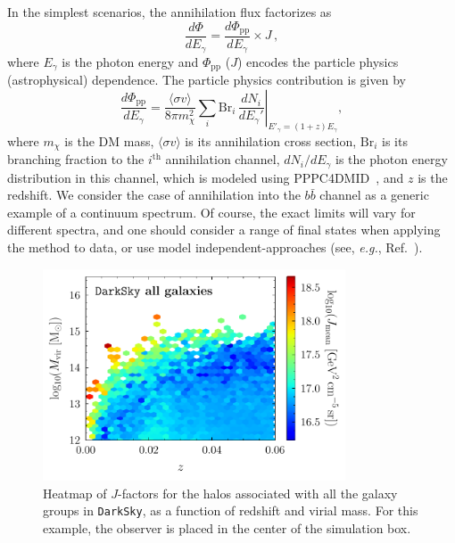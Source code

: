 In the simplest scenarios, the annihilation flux factorizes as 
\begin{equation}
\frac{d\Phi}{dE_{\gamma}} = \frac{d\Phi_\text{pp}}{dE_{\gamma}}\times J \, ,
\label{eq:flux}
\end{equation}
where $E_\gamma$ is the photon energy and $\Phi_\text{pp}$  ($J$) encodes the particle physics (astrophysical) dependence.
The particle physics contribution is given by
\begin{equation}
\frac{d\Phi_\text{pp}}{dE_{\gamma}}=\frac{\langle\sigma v\rangle}{8\pi m_{\chi}^{2}}\sum_i \text{Br}_{i}\, \left. \frac{dN_{i}}{dE_{\gamma}'} \right|_{E'_{\gamma} = (1+z) E_{\gamma}},
\end{equation}
where $m_\chi$ is the DM mass, $\langle \sigma v\rangle $ is its annihilation cross section, $\text{Br}_{i}$ is its branching fraction to the $i^\text{th}$ annihilation channel, $ dN_{i}/dE_{\gamma}$ is the photon energy distribution in this channel, which is modeled using  PPPC4DMID~\cite{Cirelli:2010xx}, and $z$ is the redshift.  We consider the case of annihilation into the $b \bar{b}$ channel as a generic example of a continuum spectrum. Of course, the exact limits will vary for different spectra, and one should  consider a range of final states when applying the method to data, or use model independent-approaches (see, {\it e.g.}, Ref.~\cite{Elor:2015tva,Elor:2015bho}).
\begin{figure}[t]
   \centering
     \includegraphics[width=0.8\textwidth]{ch-darksky/plots//DarkSky_heatmap.pdf}
   \caption{Heatmap of $J$-factors for the halos associated with all the galaxy groups in \texttt{DarkSky}, as a function of redshift and virial mass.  For this example, the observer is placed in the center of the simulation box. }
   \label{fig:heatmap}
\end{figure}


